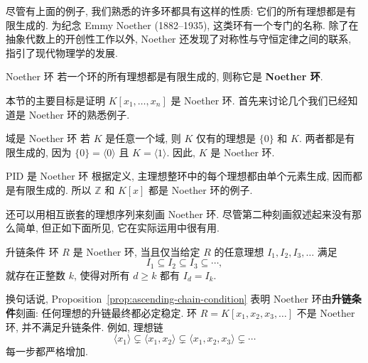 尽管有上面的例子, 我们熟悉的许多环都具有这样的性质: 它们的所有理想都是有限生成的. 为纪念 Emmy Noether (1882--1935), 这类环有一个专门的名称. 除了在抽象代数上的开创性工作以外, Noether 还发现了对称性与守恒定律之间的联系, 指引了现代物理学的发展.

\begin{Definition}{Noether 环}\leavevmode\label{def:noetherian-ring}
  若一个环的所有理想都是有限生成的, 则称它是 \textbf{Noether 环}.
\end{Definition}

本节的主要目标是证明 $K[x_{1},\ldots,x_{n}]$ 是 Noether 环. 首先来讨论几个我们已经知道是 Noether 环的熟悉例子.

\begin{Example}{域是 Noether 环}\leavevmode\label{ex:fields-are-noetherian}
  若 $K$ 是任意一个域, 则 $K$ 仅有的理想是 $\{0\}$ 和 $K$. 两者都是有限生成的, 因为 $\{0\}=\langle0\rangle$ 且 $K=\langle1\rangle$. 因此, $K$ 是 Noether 环.
\end{Example}

\begin{Example}{PID 是 Noether 环}\leavevmode\label{ex:principal-ideal-domains-are-noetherian}
  根据定义, 主理想整环中的每个理想都由单个元素生成, 因而都是有限生成的. 所以 $\mathbb{Z}$ 和 $K[x]$ 都是 Noether 环的例子.
\end{Example}

还可以用相互嵌套的理想序列来刻画 Noether 环. 尽管第二种刻画叙述起来没有那么简单, 但正如下面所见, 它在实际运用中很有用.

\begin{Proposition}{升链条件}\leavevmode\label{prop:ascending-chain-condition}
  环 $R$ 是 Noether 环, 当且仅当给定 $R$ 的任意理想 $I_{1},I_{2},I_{3},\ldots$ 满足
  \[
    I_{1}\subseteq I_{2}\subseteq I_{3}\subseteq\cdots,
  \]
  就存在正整数 $k$, 使得对所有 $d\geq k$ 都有 $I_{d}=I_{k}$.
\end{Proposition}

换句话说, Proposition~\ref{prop:ascending-chain-condition} 表明 Noether 环由\textbf{升链条件}刻画: 任何理想的升链最终都必定稳定. 环 $R=K[x_{1},x_{2},x_{3},\ldots]$ 不是 Noether 环, 并不满足升链条件. 例如, 理想链
\[
  \langle x_{1}\rangle\subsetneq\langle x_{1},x_{2}\rangle
  \subsetneq\langle x_{1},x_{2},x_{3}\rangle\subsetneq\cdots
\]
每一步都严格增加.

